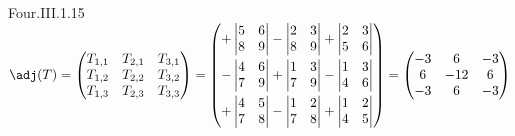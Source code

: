 \begin{ans}{Four.III.1.15}
      $
         \adj(T)
         =\begin{pmatrix}
           T_{1,1}  &T_{2,1}  &T_{3,1} \\
           T_{1,2}  &T_{2,2}  &T_{3,2} \\
           T_{1,3}  &T_{2,3}  &T_{3,3}
         \end{pmatrix}
         =\begin{pmatrix}
            +\begin{vmatrix}
               5  &6  \\ 8  &9
            \end{vmatrix}
            -\begin{vmatrix}
               2  &3  \\  8  &9
            \end{vmatrix}
            +\begin{vmatrix}
               2  &3  \\  5  &6
            \end{vmatrix}        \\[2.1ex]
            -\begin{vmatrix}
               4  &6  \\  7  &9
            \end{vmatrix}
            +\begin{vmatrix}
               1  &3  \\  7  &9
            \end{vmatrix}
            -\begin{vmatrix}
               1  &3  \\  4  &6
            \end{vmatrix}        \\[2.1ex]
            +\begin{vmatrix}
               4  &5  \\  7  &8
            \end{vmatrix}
            -\begin{vmatrix}
               1  &2  \\  7  &8
            \end{vmatrix}
            +\begin{vmatrix}
               1  &2  \\  4  &5
            \end{vmatrix}
         \end{pmatrix}
         =\begin{pmatrix}
          -3  &6   &-3 \\
           6  &-12 &6  \\
          -3  &6   &-3
         \end{pmatrix}
      $
    
\end{ans}
